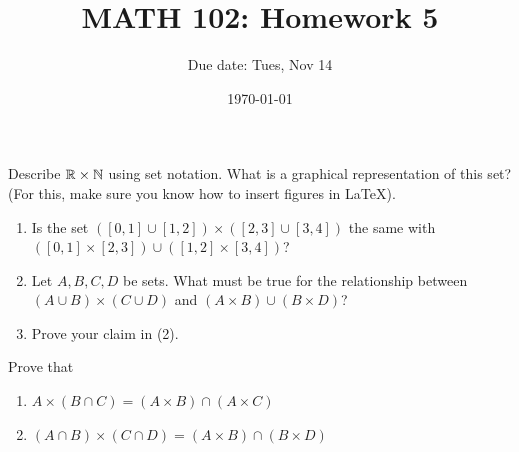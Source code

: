 \documentclass[12pt]{amsart}
\title{ MATH 102: Homework 5}
\author{Due date: Tues, Nov 14}
\date{\today}
\begin{document}
\maketitle

\begin{problem}
    Describe $\mathbb{R} \times \mathbb{N}$ using set notation.
    What is a graphical representation of this set? (For this, make sure you know
    how to insert figures in LaTeX).
\end{problem}


\begin{problem}
    \begin{enumerate}
        \item Is the set $([0,1] \cup [1,2]) \times ([2,3] \cup [3,4])$ the same with 
    $([0,1]\times [2,3])\cup ([1,2]\times [3,4])$?
        \item Let  $A,B,C,D$ be sets. What must be true for the relationship between $(A\cup B) \times (C\cup D)$
    and $(A\times B) \cup (B\times D)$?
        \item Prove your claim in (2).
    \end{enumerate}
\end{problem}

\begin{problem}
    Prove that 
    \begin{enumerate}
        \item $A \times (B\cap C) =  (A\times B) \cap (A \times C)$
        \item $(A\cap B) \times (C\cap D)= (A\times B) \cap (B\times D)$
    \end{enumerate}
\end{problem}
\end{document}
